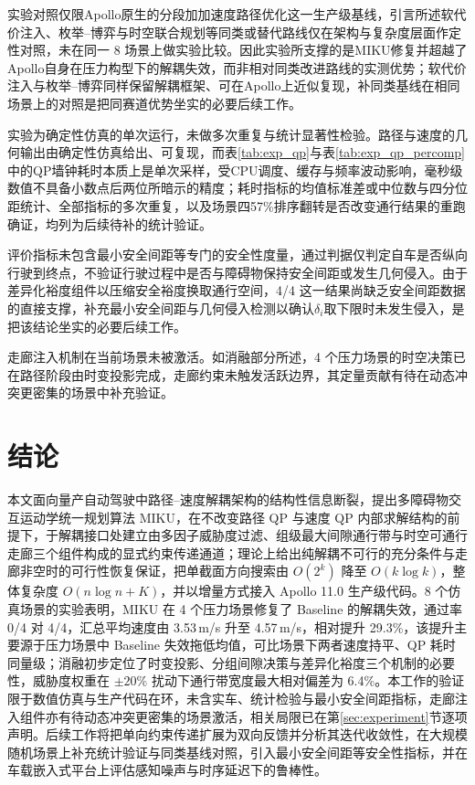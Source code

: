 \documentclass[a4paper,zihao=5]{ctexart}
\theoremstyle{definition}
\begin{document}
实验对照仅限Apollo原生的分段加加速度路径优化这一生产级基线，引言所述软代价注入、枚举--博弈与时空联合规划等同类或替代路线仅在架构与复杂度层面作定性对照，未在同一 8 场景上做实验比较。因此实验所支撑的是MIKU修复并超越了Apollo自身在压力构型下的解耦失效，而非相对同类改进路线的实测优势；软代价注入与枚举--博弈同样保留解耦框架、可在Apollo上近似复现，补同类基线在相同场景上的对照是把同赛道优势坐实的必要后续工作。

实验为确定性仿真的单次运行，未做多次重复与统计显著性检验。路径与速度的几何输出由确定性仿真给出、可复现，而表\ref{tab:exp_qp}与表\ref{tab:exp_qp_percomp}中的QP墙钟耗时本质上是单次采样，受CPU调度、缓存与频率波动影响，毫秒级数值不具备小数点后两位所暗示的精度；耗时指标的均值标准差或中位数与四分位距统计、全部指标的多次重复，以及场景四57\%排序翻转是否改变通行结果的重跑确证，均列为后续待补的统计验证。

评价指标未包含最小安全间距等专门的安全性度量，通过判据仅判定自车是否纵向行驶到终点，不验证行驶过程中是否与障碍物保持安全间距或发生几何侵入。由于差异化裕度组件以压缩安全裕度换取通行空间，4/4 这一结果尚缺乏安全间距数据的直接支撑，补充最小安全间距与几何侵入检测以确认$\delta_i$取下限时未发生侵入，是把该结论坐实的必要后续工作。

走廊注入机制在当前场景未被激活。如消融部分所述，4 个压力场景的时空决策已在路径阶段由时变投影完成，走廊约束未触发活跃边界，其定量贡献有待在动态冲突更密集的场景中补充验证。

\section{结论}
\label{sec:conclusion}

本文面向量产自动驾驶中路径--速度解耦架构的结构性信息断裂，提出多障碍物交互运动学统一规划算法 MIKU，在不改变路径 QP 与速度 QP 内部求解结构的前提下，于解耦接口处建立由多因子威胁度过滤、组级最大间隙通行带与时空可通行走廊三个组件构成的显式约束传递通道；理论上给出纯解耦不可行的充分条件与走廊非空时的可行性恢复保证，把单截面方向搜索由 $O(2^k)$ 降至 $O(k\log k)$，整体复杂度 $O(n\log n + K)$，并以增量方式接入 Apollo 11.0 生产级代码。8 个仿真场景的实验表明，MIKU 在 4 个压力场景修复了 Baseline 的解耦失效，通过率 0/4 对 4/4，汇总平均速度由 3.53\,m/s 升至 4.57\,m/s，相对提升 29.3\%，该提升主要源于压力场景中 Baseline 失效拖低均值，可比场景下两者速度持平、QP 耗时同量级；消融初步定位了时变投影、分组间隙决策与差异化裕度三个机制的必要性，威胁度权重在 $\pm 20\%$ 扰动下通行带宽度最大相对偏差为 6.4\%。本工作的验证限于数值仿真与生产代码在环，未含实车、统计检验与最小安全间距指标，走廊注入组件亦有待动态冲突更密集的场景激活，相关局限已在第\ref{sec:experiment}节逐项声明。后续工作将把单向约束传递扩展为双向反馈并分析其迭代收敛性，在大规模随机场景上补充统计验证与同类基线对照，引入最小安全间距等安全性指标，并在车载嵌入式平台上评估感知噪声与时序延迟下的鲁棒性。

\printbibliography[heading=bibintoc,title={参考文献}]
\end{document}

